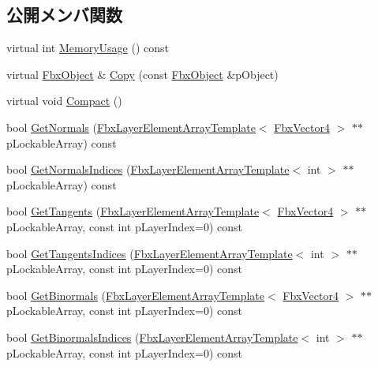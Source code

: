 \subsection*{公開メンバ関数}
\begin{DoxyCompactItemize}
\item 
virtual int \hyperlink{class_fbx_geometry_base_a858cccba0c319e1ee9160c0d7209bacf}{Memory\+Usage} () const
\item 
virtual \hyperlink{class_fbx_object}{Fbx\+Object} \& \hyperlink{class_fbx_geometry_base_a2c3754831338327259c35caebbf379d3}{Copy} (const \hyperlink{class_fbx_object}{Fbx\+Object} \&p\+Object)
\item 
virtual void \hyperlink{class_fbx_geometry_base_a66146155ecad4e6f6f2e8cf52e0340f6}{Compact} ()
\item 
bool \hyperlink{class_fbx_geometry_base_ad30d8655b9606f653e9467bb07c8b1f3}{Get\+Normals} (\hyperlink{class_fbx_layer_element_array_template}{Fbx\+Layer\+Element\+Array\+Template}$<$ \hyperlink{class_fbx_vector4}{Fbx\+Vector4} $>$ $\ast$$\ast$p\+Lockable\+Array) const
\item 
bool \hyperlink{class_fbx_geometry_base_ace44c4c25817ccabcf32e4c5b3b32936}{Get\+Normals\+Indices} (\hyperlink{class_fbx_layer_element_array_template}{Fbx\+Layer\+Element\+Array\+Template}$<$ int $>$ $\ast$$\ast$p\+Lockable\+Array) const
\item 
bool \hyperlink{class_fbx_geometry_base_aa8b22c9380e8c8be64855a6409136210}{Get\+Tangents} (\hyperlink{class_fbx_layer_element_array_template}{Fbx\+Layer\+Element\+Array\+Template}$<$ \hyperlink{class_fbx_vector4}{Fbx\+Vector4} $>$ $\ast$$\ast$p\+Lockable\+Array, const int p\+Layer\+Index=0) const
\item 
bool \hyperlink{class_fbx_geometry_base_aa1da929bb1905386e98d8e1caff3556e}{Get\+Tangents\+Indices} (\hyperlink{class_fbx_layer_element_array_template}{Fbx\+Layer\+Element\+Array\+Template}$<$ int $>$ $\ast$$\ast$p\+Lockable\+Array, const int p\+Layer\+Index=0) const
\item 
bool \hyperlink{class_fbx_geometry_base_a935f60845a0b9a5d484a8540f52ee07d}{Get\+Binormals} (\hyperlink{class_fbx_layer_element_array_template}{Fbx\+Layer\+Element\+Array\+Template}$<$ \hyperlink{class_fbx_vector4}{Fbx\+Vector4} $>$ $\ast$$\ast$p\+Lockable\+Array, const int p\+Layer\+Index=0) const
\item 
bool \hyperlink{class_fbx_geometry_base_af3b46f6aaa0e79c91ad7a89977413f57}{Get\+Binormals\+Indices} (\hyperlink{class_fbx_layer_element_array_template}{Fbx\+Layer\+Element\+Array\+Template}$<$ int $>$ $\ast$$\ast$p\+Lockable\+Array, const int p\+Layer\+Index=0) const
\end{DoxyCompactItemize}
